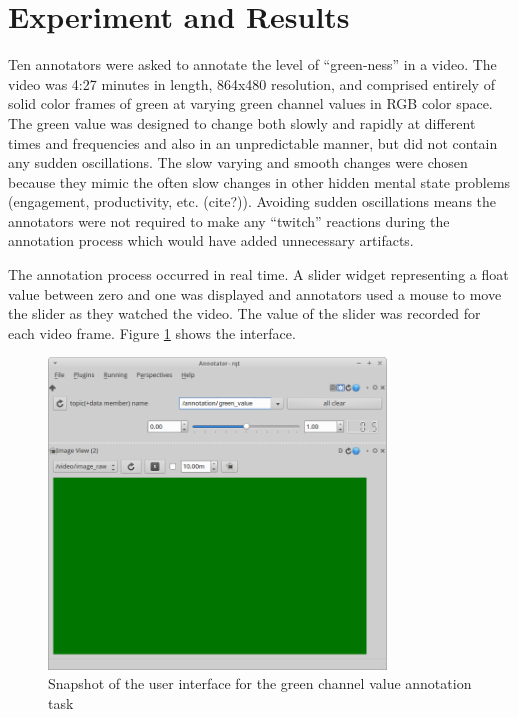 \documentclass[]{article}
\begin{document}
\section{Experiment and Results}
Ten annotators were asked to annotate the level of ``green-ness'' in a video.  The video was 4:27 minutes in length, 864x480 resolution, and comprised entirely of solid color frames of green at varying green channel values in RGB color space.  The green value was designed to change both slowly and rapidly at different times and frequencies and also in an unpredictable manner, but did not contain any sudden oscillations.  The slow varying and smooth changes were chosen because they mimic the often slow changes in other hidden mental state problems (engagement, productivity, etc. (cite?)).  Avoiding sudden oscillations means the annotators were not required to make any ``twitch'' reactions during the annotation process which would have added unnecessary artifacts.

The annotation process occurred in real time.  A slider widget representing a float value between zero and one was displayed and annotators used a mouse to move the slider as they watched the video.  The value of the slider was recorded for each video frame.  Figure \ref{fig:annotation_ui} shows the interface.

\begin{figure}
	\centering
	\includegraphics[width=0.8\textwidth]{images/green_ui}
	\caption{Snapshot of the user interface for the green channel value annotation task}
	\label{fig:annotation_ui}
\end{figure}
\end{document}
